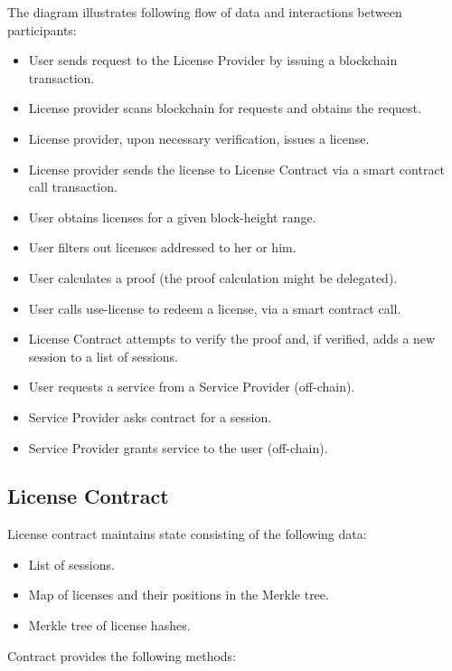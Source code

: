 The diagram illustrates following flow of data and interactions between participants:

\begin{itemize}%
	\item User sends request to the License Provider by issuing a blockchain transaction.
	\item License provider scans blockchain for requests and obtains the request.
	\item License provider, upon necessary verification, issues a license.
	\item License provider sends the license to License Contract via a smart contract call transaction.
	\item User obtains licenses for a given block-height range.
	\item User filters out licenses addressed to her or him.
	\item User calculates a proof (the proof calculation might be delegated).
	\item User calls use-license to redeem a license, via a smart contract call.
	\item License Contract attempts to verify the proof and, if verified, adds a new session to a list of sessions.
	\item User requests a service from a Service Provider (off-chain).
	\item Service Provider asks contract for a session.
	\item Service Provider grants service to the user (off-chain).
\end{itemize}


\subsection{License Contract}

\begin{flushleft}
License contract maintains state consisting of the following data:
\end{flushleft}

\begin{itemize}%
	\item List of sessions.
	\item Map of licenses and their positions in the Merkle tree.
	\item Merkle tree of license hashes.
\end{itemize}


\begin{flushleft}
Contract provides the following methods:
\end{flushleft}

